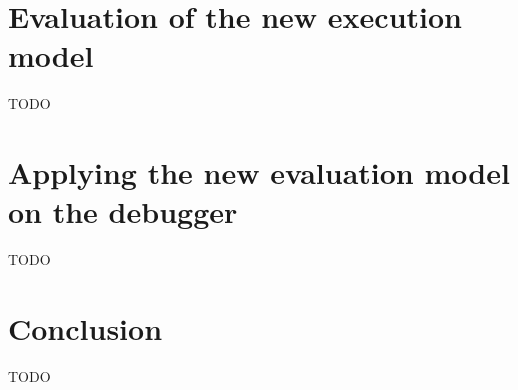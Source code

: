 \documentclass[../main]{subfiles}
\begin{document}
\section{Evaluation of the new execution model}\label{sec:evaluation-of-the-new-execution-model}

TODO

\section{Applying the new evaluation model on the debugger}\label{sec:applying-the-new-evaluation-model-on-the-debugger}

TODO

\section{Conclusion}\label{sec:conclusion}

TODO
\end{document}

